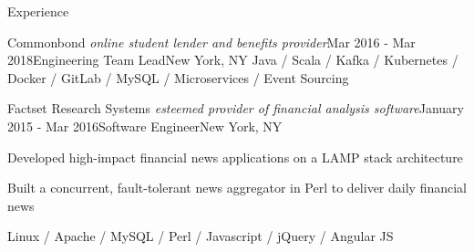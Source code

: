 \documentclass{resume} %
\begin{document}
\begin{rSection}{Experience}
\begin{rSubsection}{Commonbond \textit{\scriptsize online student lender and benefits provider}}{Mar 2016 - Mar 2018}{Engineering Team Lead}{New York, NY}
Java / Scala / Kafka / Kubernetes / Docker / GitLab / MySQL / Microservices / Event Sourcing
\end{rSubsection}


\begin{rSubsection}{Factset Research Systems \textit{\scriptsize esteemed provider of financial analysis software}}{January 2015 - Mar 2016}{Software Engineer}{New York, NY}
\item Developed high-impact financial news applications on a LAMP stack architecture
\item Built a concurrent, fault-tolerant news aggregator in Perl to deliver daily financial news
\end{rSubsection}

Linux / Apache / MySQL / Perl / Javascript / jQuery / Angular JS
\end{rSection}





\end{document}
